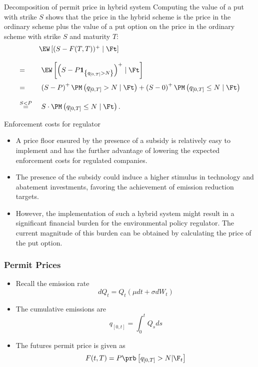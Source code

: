 {Decomposition of permit price in hybrid system}
Computing the value of a put with strike $S$ shows that the price in the hybrid scheme is the price in the ordinary scheme plus the value of a put option on the price in the ordinary scheme with strike $S$ and maturity $T$:
$$
\begin{array}{ll}
&\EW\left[ (S-F(T,T))^+ \mid \Ft \right]\\*[12pt]
=& \ \EW\left[ \left( S- P \textbf{1}_{\left\{ q_{[0,T]} > N \right\}} \right)^+ \mid \Ft \right] \\*[12pt]
=& \ \left( S- P \right)^+ \PM \left( q_{[0,T]} > N \mid \Ft \right) + \left( S- 0 \right)^+ \PM \left( q_{[0,T]} \le N \mid \Ft \right) \\*[12pt]
 \stackrel{S<P}{=}& \ S \cdot \PM \left( q_{[0,T]} \le N \mid \Ft \right).
\end{array}
$$




{Enforcement costs for regulator}
\begin{itemize}
\item<1-> A price floor ensured by the presence of a subsidy is relatively easy to implement and has the further advantage of lowering the expected enforcement costs for regulated companies.
\item<2-> The presence of the subsidy could induce a higher stimulus in technology and abatement investments, favoring the achievement of emission reduction targets.
\item<3-> However, the implementation of such a hybrid system might result in a significant financial burden for the environmental policy regulator. The current magnitude of this burden can be obtained by calculating the price of the put option.
\end{itemize}




\begin{frame}
\frametitle{Permit Prices}
\begin{itemize}
\item<1-> Recall the emission rate
$$
dQ_t = Q_t(\mu dt + \sigma dW_t)
$$
\item<2->
The cumulative emissions are
$$
q_{[0,t]} = \int_0^t Q_s ds
$$
\item<3->
The futures permit price is given as
$$
F(t,T) = P \prb\left[q_{[0,T]}>N |\F_t\right]
$$
\end{itemize}
\end{frame}

